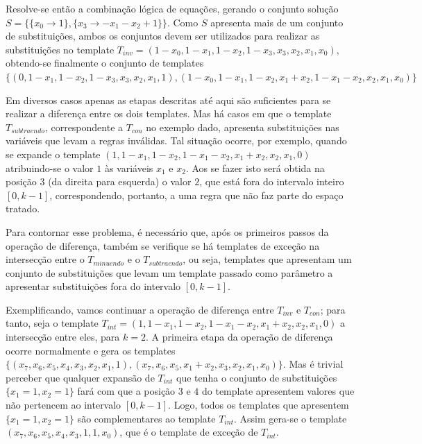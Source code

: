 \documentclass[12pt, a4paper]{article}
\begin{document}
Resolve-se então a combinação lógica de equações, gerando o conjunto solução $S = \{\{x_0\to 1\},\{x_3\to -x_1-x_2+1\}\}$. Como $S$ apresenta mais de um conjunto de substituições, ambos os conjuntos devem ser utilizados para realizar as substituições no template $T_{inv} = (1 - x_0, 1 - x_1, 1 - x_2, 1 - x_3, x_3, x_2, x_1, x_0)$, obtendo-se finalmente o conjunto de templates $\{(0, 1 - x_1, 1 - x_2, 1 - x_3, x_3, x_2, x_1, 1),(1 - x_0, 1 - x_1, 1 - x_2, x_1 + x_2, 1 - x_1 - x_2, x_2, x_1, x_0)\}$

Em diversos casos apenas as etapas descritas até aqui são suficientes para se realizar a diferença entre os dois templates. Mas há casos em que o template $T_{subtraendo}$, correspondente a $T_{con}$ no exemplo dado, apresenta substituições nas variáveis que levam a regras inválidas. Tal situação ocorre, por exemplo, quando se expande o template $(1, 1 - x_1, 1 - x_2, 1 - x_1 - x_2, x_1 + x_2, x_2, x_1, 0)$ atribuindo-se o valor $1$ às variáveis $x_1$ e $x_2$. Aos se fazer isto será obtida na posição $3$ (da direita para esquerda) o valor $2$, que está fora do intervalo inteiro $[0,k-1]$, correspondendo, portanto, a uma regra que não faz parte do espaço tratado.

Para contornar esse problema, é necessário que, após os primeiros passos da operação de diferença, também se verifique se há templates de exceção na intersecção entre o $T_{minuendo}$ e o $T_{subtraendo}$, ou seja, templates que apresentam um conjunto de substituições que levam um template passado como parâmetro a apresentar substituições fora do intervalo $[0,k-1]$. %

Exemplificando, vamos continuar a operação de diferença entre $T_{inv}$ e $T_{con}$; para tanto, seja o template $T_{int} = (1, 1 - x_1, 1 - x_2, 1 - x_1 - x_2, x_1 + x_2, x_2, x_1, 0)$ a intersecção entre eles, para $k=2$.
A primeira etapa da operação de diferença ocorre normalmente e gera os templates $\{(x_7, x_6, x_5, x_4, x_3, x_2, x_1, 1),(x_7, x_6, x_5, x_1 + x_2, x_3, x_2, x_1, x_0)\}$.
Mas é trivial perceber que qualquer expansão de $T_{int}$ que tenha o conjunto de substituições $\{x_1 = 1, x_2 = 1\}$ fará com que a posição $3$ e $4$ do template apresentem valores que não pertencem ao intervalo $[0,k-1]$.
Logo, todos os templates que apresentem $\{x_1 = 1, x_2 = 1\}$ são complementares ao template $T_{int}$. Assim gera-se o template $(x_7, x_6, x_5, x_4, x_3, 1, 1, x_0)$, que é o template de exceção de $T_{int}$.
\end{document}
